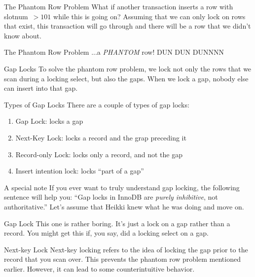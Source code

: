 \documentclass[14pt]{beamer}
\newcommand{\myitem}{\item[\textbullet]}
\begin{document}
\begin{frame}{The Phantom Row Problem}
  What if another transaction inserts a row with slotnum~$>101$ while this is
  going on?
  \newline
  \newline
  Assuming that we can only lock on rows that exist, this transaction
  will go through and there will be a row that we didn't know about.
\end{frame}

\begin{frame}{The Phantom Row Problem}
  ...a \emph{PHANTOM} row! DUN DUN DUNNNN
\end{frame}

\begin{frame}{Gap Locks}
  To solve the phantom row problem, we lock not only the rows that we scan
  during a locking select, but also the gaps. When we lock a gap, nobody else
  can insert into that gap.
\end{frame}

\begin{frame}{Types of Gap Locks}
  There are a couple of types of gap locks:
  \begin{enumerate}
    \myitem Gap Lock: locks a gap
    \myitem Next-Key Lock: locks a record and the grap preceding it
    \myitem Record-only Lock: locks only a record, and not the gap
    \myitem Insert intention lock: locks ``part of a gap''
  \end{enumerate}
\end{frame}

\begin{frame}{A special note}
  If you ever want to truly understand gap locking, the following sentence will
  help you: ``Gap locks in InnoDB are \emph{purely inhibitive}, not
  authoritative.'' Let's assume that Heikki knew what he was doing and move on.
\end{frame}

\begin{frame}{Gap Lock}
  This one is rather boring. It's just a lock on a gap rather than a record. You
  might get this if, you say, did a locking select on a gap.
\end{frame}

\begin{frame}{Next-key Lock}
  Next-key locking refers to the idea of locking the gap prior to the record
  that you scan over. This prevents the phantom row problem mentioned earlier.
  However, it can lead to some counterintuitive behavior.
\end{frame}
\end{document}
